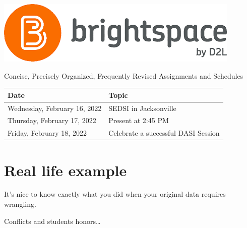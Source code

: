 \documentclass[
]{book}
\begin{document}
\begin{center}\includegraphics{_images/brightspace} \end{center}

Concise, Precisely Organized, Frequently Revised Assignments and Schedules

\begin{longtable}[]{@{}ll@{}}
\toprule
Date & Topic \\
\midrule
\endhead
Wednesday, February 16, 2022 & SEDSI in Jacksonville \\
Thursday, February 17, 2022 & Present at 2:45 PM \\
Friday, February 18, 2022 & Celebrate a successful DASI Session \\
\bottomrule
\end{longtable}

\hypertarget{real-life-example}{%
\chapter{Real life example}\label{real-life-example}}

It's nice to know exactly what you did when your original data requires wrangling.

Conflicts and students honors\ldots{}
\end{document}
